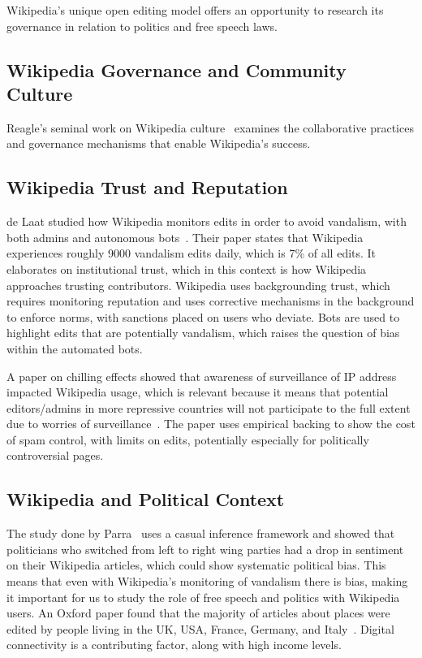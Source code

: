 
\label{sec:related}

Wikipedia’s unique open editing model offers an opportunity to research its governance in relation to politics and free speech laws.

\subsection{Wikipedia Governance and Community Culture}

Reagle's seminal work on Wikipedia culture~\cite{reagle2010good} examines the collaborative practices and governance mechanisms that enable Wikipedia's success. 

\subsection{Wikipedia Trust and Reputation}
de Laat studied how Wikipedia monitors edits in order to avoid vandalism, with both admins and autonomous bots~\cite{de2014open}. Their paper states that Wikipedia experiences roughly 9000 vandalism edits daily, which is 7\% of all edits. It elaborates on institutional trust, which in this context is how Wikipedia approaches trusting contributors. Wikipedia uses backgrounding trust, which requires monitoring reputation and uses corrective mechanisms in the background to enforce norms, with sanctions placed on users who deviate. Bots are used to highlight edits that are potentially vandalism, which raises the question of bias within the automated bots. 

A paper on chilling effects showed that awareness of surveillance of IP address impacted Wikipedia usage, which is relevant because it means that potential editors/admins in more repressive countries will not participate to the full extent due to worries of surveillance~\cite{penney2016chilling}. The paper uses empirical backing to show the cost of spam control, with limits on edits, potentially especially for politically controversial pages.

\subsection{Wikipedia and Political Context}
The study done by Parra~\cite{parra2024righting} uses a casual inference framework and showed that politicians who switched from left to right wing parties had a drop in sentiment on their Wikipedia articles, which could show systematic political bias. This means that even with Wikipedia's monitoring of vandalism there is bias, making it important for us to study the role of free speech and politics with Wikipedia users. An Oxford paper found that the majority of articles about places were edited by people living in the UK, USA, France, Germany, and Italy~\cite{Oxford2015WikipediaWorldView}. Digital connectivity is a contributing factor, along with high income levels.

